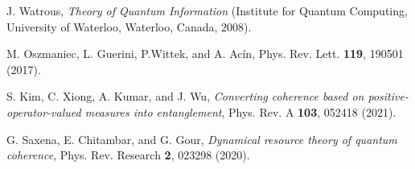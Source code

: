 \documentclass[american,aps,pra,reprint, superscriptaddress]{revtex4-1}
\theoremstyle{plain}
\theoremstyle{definition}
\theoremstyle{remark}
\begin{document}
\begin{thebibliography}{99}
  J. Watrous, {\it Theory of Quantum Information} (Institute for Quantum Computing, University of Waterloo, Waterloo, Canada, 2008).

 M. Oszmaniec, L. Guerini, P.Wittek, and A. Ac\'{i}n, Phys. Rev. Lett. {\bf 119}, 190501 (2017).

 S. Kim, C. Xiong, A. Kumar, and J. Wu, {\it Converting coherence based on positive-operator-valued measures into entanglement}, Phys. Rev. A {\bf 103}, 052418 (2021).

 G. Saxena, E. Chitambar, and G. Gour, {\it Dynamical resource theory of quantum coherence}, Phys. Rev. Research {\bf 2}, 023298 (2020).



\end{thebibliography}%
\end{document}
